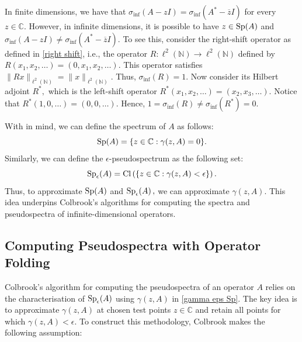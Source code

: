 In finite dimensions, we have that $\sigma_{\inf}(A-zI) = \sigma_{\inf}(A^*-\overline{z}I)$ for every $z \in \mathbb{C}.$ However, in infinite dimensions, it is possible to have $z \in \operatorname{Sp}\!\left(A\right)$ and $\sigma_{\inf}(A-zI) \ne \sigma_{\inf}(A^*-\overline{z}I).$ To see this, consider the right-shift operator as defined in \eqref{right shift}, i.e., the operator $R:\ell^2(\mathbb{N}) \rightarrow \ell^2(\mathbb{N})$ defined by $R(x_1, x_2, \dots) = (0, x_1, x_2, \dots).$ This operator satisfies $\|Rx\|_{\ell^2(\mathbb{N})} = \|x\|_{\ell^2(\mathbb{N})}.$ Thus, $\sigma_{\inf}(R) = 1.$ Now consider its Hilbert adjoint $R^*,$ which is the left-shift operator $R^*(x_1, x_2, \dots) = (x_2, x_3, \dots).$ Notice that $R^*(1, 0, \dots) = (0, 0, \dots).$ Hence, $1 = \sigma_{\inf}(R) \ne \sigma_{\inf}(R^*) = 0.$

With  in mind, we can define the spectrum of $A$ as follows: 
\begin{equation}\label{gamma Sp}
    \operatorname{Sp}\!\left(A\right) = \{ z \in \mathbb{C} : \gamma(z, A) = 0\}.
\end{equation}
Similarly, we can define the $\epsilon$-pseudospectrum as the following set:
\begin{equation} \label{gamma eps Sp}
    \operatorname{Sp}_{\epsilon}\!\left(A\right) = \operatorname{Cl} \left(\{ z \in \mathbb{C} : \gamma(z, A) < \epsilon\}\right).
\end{equation}
Thus, to approximate $\operatorname{Sp}\!\left(A\right)$ and $\operatorname{Sp}_{\epsilon}\!\left(A\right),$ we can approximate $\gamma(z, A).$ This idea underpins Colbrook's algorithms for computing the spectra and pseudospectra of infinite-dimensional operators.


\subsection{Computing Pseudospectra with Operator Folding} \label{Fold sect}

Colbrook's algorithm for computing the pseudospectra of an operator $A$ relies on the characterisation of $\operatorname{Sp}_{\epsilon}\!\left(A\right)$ using $\gamma(z,A)$ in \eqref{gamma eps Sp}. The key idea is to approximate $\gamma(z, A)$ at chosen test points $z \in \mathbb{C}$ and retain all points for which $\gamma(z, A) < \epsilon.$ To construct this methodology, Colbrook makes the following assumption:

